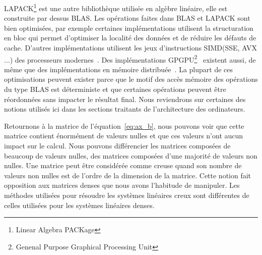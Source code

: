 LAPACK\footnote{Linear Algebra PACKage} est une autre bibliothèque utilisée en algèbre linéaire, elle est construite par dessus BLAS.
%
Les opérations faites dans BLAS et LAPACK sont bien optimisées, par exemple certaines implémentations utilisent la structuration en bloc qui permet d'optimiser la localité des données et de réduire les défauts de cache.
%
D'autres implémentations utilisent les jeux d'instructions SIMD(SSE, AVX ...) des processeurs modernes~\cite{intel_mkl}.
%
Des implémentations GPGPU\footnote{Genenal Purpose Graphical Processing Unit}~\cite{nvidia_cublas} existent aussi, de même que des implémentations en mémoire distribuée~\cite{dplasma}.
%
La plupart de ces optimisations peuvent exister parce que le motif des accès mémoire des opérations du type BLAS est déterministe et que certaines opérations peuvent être réordonnées sans impacter le résultat final.
%
Nous reviendrons sur certaines des notions utilisés ici dans les sections traitants de l'architecture des ordinateurs.


Retournons à la matrice de l'équation~\eqref{eq:ax_b}, nous pouvons voir que cette matrice contient énormément de valeurs nulles et que ces valeurs n'ont aucun impact sur le calcul.
%
Nous pouvons différencier les matrices composées de beaucoup de valeurs nulles, des matrices composées d'une majorité de valeurs non nulles.
%
Une matrice peut être considérée comme creuse quand son nombre de valeurs non nulles est de l'ordre de la dimension de la matrice.
%
Cette notion fait opposition aux matrices denses que nous avons l'habitude de manipuler.
%
Les méthodes utilisées pour résoudre les systèmes linéaires creux sont différentes de celles utilisées pour les systèmes linéaires denses.
